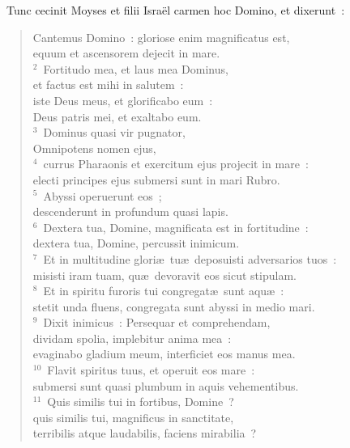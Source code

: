 ~\lettrine[lines=10,image=true,loversize=0.05,lraise=-0.03]{T}{}unc cecinit Moyses et filii Isra\"el carmen hoc Domino, et dixerunt~: \begin{flushleft}\begin{verse}\vspace{6pt}Cantemus Domino~: gloriose enim magnificatus est,\\ equum et ascensorem dejecit in mare.\\
${}^{2}$~Fortitudo mea, et laus mea Dominus,\\ et factus est mihi in salutem~:\\ iste Deus meus, et glorificabo eum~:\\ Deus patris mei, et exaltabo eum.\\
${}^{3}$~Dominus quasi vir pugnator,\\ Omnipotens nomen ejus,\\
${}^{4}$~currus Pharaonis et exercitum ejus projecit in mare~:\\ electi principes ejus submersi sunt in mari Rubro.\\
${}^{5}$~Abyssi operuerunt eos~;\\ descenderunt in profundum quasi lapis.\\
${}^{6}$~Dextera tua, Domine, magnificata est in fortitudine~:\\ dextera tua, Domine, percussit inimicum.\\
${}^{7}$~Et in multitudine glori\ae\ tu\ae\ deposuisti adversarios tuos~:\\ misisti iram tuam, qu\ae\ devoravit eos sicut stipulam.\\
${}^{8}$~Et in spiritu furoris tui congregat\ae\ sunt aqu\ae~:\\ stetit unda fluens, congregata sunt abyssi in medio mari.\\
${}^{9}$~Dixit inimicus~: Persequar et comprehendam,\\ dividam spolia, implebitur anima mea~:\\ evaginabo gladium meum, interficiet eos manus mea.\\
${}^{10}$~Flavit spiritus tuus, et operuit eos mare~:\\ submersi sunt quasi plumbum in aquis vehementibus.\\
${}^{11}$~Quis similis tui in fortibus, Domine~?\\ quis similis tui, magnificus in sanctitate,\\ terribilis atque laudabilis, faciens mirabilia~?\\

\end{verse}
\end{flushleft}
